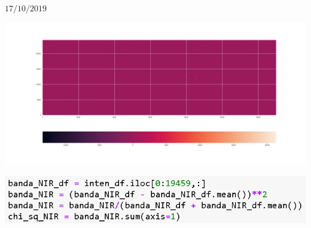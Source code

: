 \documentclass[12pt,dvipsnames]{exam}
\begin{document}
\hrulefill

$17/10/2019$

\begin{center}
	\includegraphics[scale=0.3]{imgs/gui/chi_sq.png}
\end{center}

\begin{center}
	\includegraphics[scale=1.0]{imgs/gui/chunk_sq.png}
\end{center}
\end{document}
